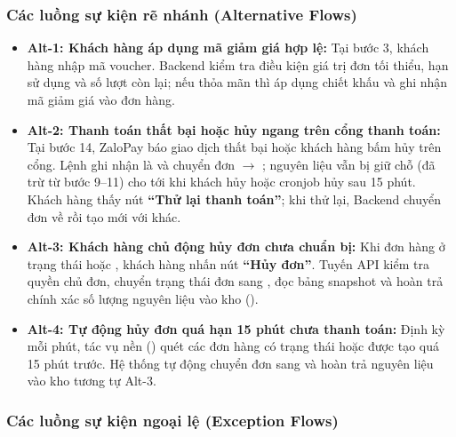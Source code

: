 \subsubsection{Các luồng sự kiện rẽ nhánh (Alternative Flows)}

\begin{itemize}[leftmargin=1.5em]
  \item \textbf{Alt-1: Khách hàng áp dụng mã giảm giá hợp lệ:} Tại bước 3, khách hàng nhập mã voucher. Backend kiểm tra điều kiện giá trị đơn tối thiểu, hạn sử dụng và số lượt còn lại; nếu thỏa mãn thì áp dụng chiết khấu và ghi nhận mã giảm giá vào đơn hàng.
  \item \textbf{Alt-2: Thanh toán thất bại hoặc hủy ngang trên cổng thanh toán:} Tại bước 14, ZaloPay báo giao dịch thất bại hoặc khách hàng bấm hủy trên cổng. Lệnh  ghi nhận  là  và chuyển đơn  $\rightarrow$ ; nguyên liệu vẫn bị giữ chỗ (đã trừ từ bước 9--11) cho tới khi khách hủy hoặc cronjob hủy sau 15 phút. Khách hàng thấy nút \textbf{``Thử lại thanh toán''}; khi thử lại, Backend chuyển đơn về  rồi tạo  mới với  khác.
  \item \textbf{Alt-3: Khách hàng chủ động hủy đơn chưa chuẩn bị:} Khi đơn hàng ở trạng thái  hoặc , khách hàng nhấn nút \textbf{``Hủy đơn''}. Tuyến API  kiểm tra quyền chủ đơn, chuyển trạng thái đơn sang , đọc bảng snapshot  và hoàn trả chính xác số lượng nguyên liệu vào kho ().
  \item \textbf{Alt-4: Tự động hủy đơn quá hạn 15 phút chưa thanh toán:} Định kỳ mỗi phút, tác vụ nền () quét các đơn hàng có trạng thái  hoặc  được tạo quá 15 phút trước. Hệ thống tự động chuyển đơn sang  và hoàn trả nguyên liệu vào kho tương tự Alt-3.
\end{itemize}

\subsubsection{Các luồng sự kiện ngoại lệ (Exception Flows)}

